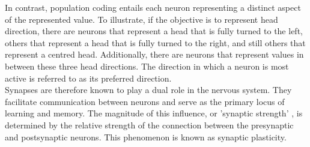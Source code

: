 \noindent In contrast, population coding entails each neuron representing a distinct aspect of the represented value. To illustrate, if the objective is to represent head direction, there are neurons that represent a head that is fully turned to the left, others that represent a head that is fully turned to the right, and still others that represent a centred head. Additionally, there are neurons that represent values in between these three head directions. The direction in which a neuron is most active is referred to as its preferred direction. \\




\noindent Synapses are therefore known to play a dual role in the nervous system. They facilitate communication between neurons and serve as the primary locus of learning and memory. The magnitude of this influence, or 'synaptic strength' \cite{bastos2022motor}, is determined by the relative strength of the connection between the presynaptic and postsynaptic neurons. This phenomenon is known as synaptic plasticity. \\

